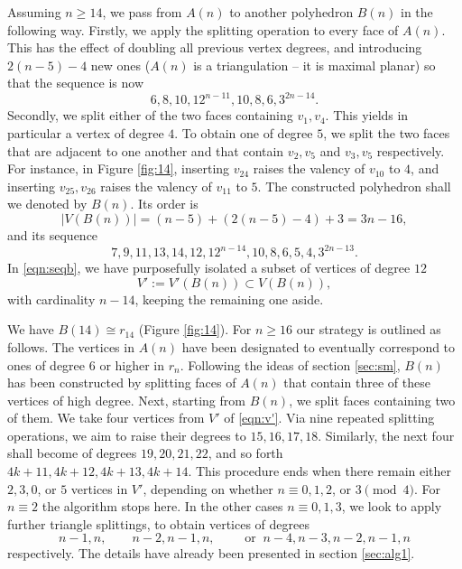 \documentclass[11pt]{article}
\theoremstyle{definition}
\numberwithin{equation}{section}
\def\calP{\mathcal{P}}
\begin{document}
Assuming $n\geq 14$, we pass from $A(n)$ to another polyhedron $B(n)$ in the following way. Firstly, we apply the splitting operation to every face of $A(n)$. This has the effect of doubling all previous vertex degrees, and introducing $2(n-5)-4$ new ones ($A(n)$ is a triangulation -- it is maximal planar) so that the sequence is now
\[6,8,10,12^{n-11},10,8,6,3^{2n-14}.\]
Secondly, we split either of the two faces containing $v_1,v_4$. This yields in particular a vertex of degree $4$. To obtain one of degree $5$, we split the two faces that are adjacent to one another and that contain $v_2,v_5$ and $v_3,v_5$ respectively. For instance, in  Figure \ref{fig:14}, inserting $v_{24}$ raises the valency of $v_{10}$ to $4$, and inserting $v_{25},v_{26}$ raises the valency of $v_{11}$ to $5$. The constructed polyhedron shall we denoted by $B(n)$. Its order is
\begin{equation}
|V(B(n))|=(n-5)+(2(n-5)-4)+3=3n-16,
\end{equation}
and its sequence
\begin{equation}
\label{eqn:seqb}
7,9,11,13,14,12,12^{n-14},10,8,6,5,4,3^{2n-13}.
\end{equation}
In \eqref{eqn:seqb}, we have purposefully isolated a subset of vertices of degree $12$
\begin{equation}
\label{eqn:v'}
V':=V'(B(n))\subset V(B(n)),
\end{equation}
with cardinality $n-14$, keeping the remaining one aside.



We have $B(14)\cong r_{14}$ (Figure \ref{fig:14}). For $n\geq 16$ our strategy is outlined as follows. The vertices in $A(n)$ have been designated to eventually correspond to ones of degree $6$ or higher in $r_n$. Following the ideas of section \ref{sec:sm}, $B(n)$ has been constructed by splitting faces of $A(n)$ that contain three of these vertices of high degree. Next, starting from $B(n)$, we split faces containing two of them. We take four vertices from $V'$ of \eqref{eqn:v'}. Via nine repeated splitting operations, we aim to raise their degrees to $15,16,17,18$. Similarly, the next four shall become of degrees $19,20,21,22$, and so forth $4k+11,4k+12,4k+13,4k+14$. %
This procedure ends when there remain either $2,3,0$, or $5$ vertices in $V'$, depending on whether $n\equiv 0,1,2$, or $3 \pmod 4$. For $n\equiv 2$ the algorithm stops here. In the other cases $n\equiv 0,1,3$, we look to apply %
further triangle splittings, to obtain vertices of degrees
\[n-1,n, \qquad n-2,n-1,n, \qquad\text{ or }\ n-4,n-3,n-2,n-1,n\]
respectively. The details have already been presented in section \ref{sec:alg1}.
\end{document}
